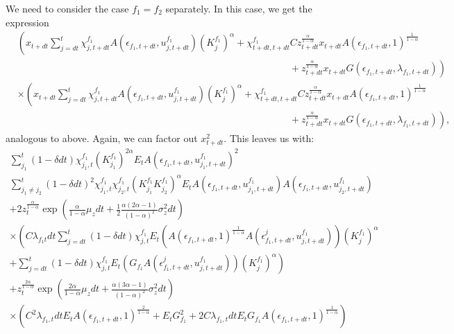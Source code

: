 We need to consider the case $f_1 = f_2$ separately. In this case, we get the expression 
{\footnotesize
\begin{align*}
    &\left(x_{t+dt} \sum_{ j = dt}^{t} \chi_{j, t+dt}^{f_1} A(\epsilon_{f_1,t+dt}, u_{j, t+dt}^{f_1})( K_j^{f_1})^{\alpha} + \chi_{t+dt, t+dt}^{f_1}C z_{t+dt}^{\frac{\alpha}{1 - \alpha}} x_{t+dt} A(\epsilon_{f_1, t+dt}, 1)^{\frac{1}{1 - \alpha}} \right.\\
    &\left.\qquad \qquad\qquad \qquad \qquad \qquad\qquad \qquad\qquad \qquad\qquad \qquad\qquad \qquad+ z_{t+dt}^{\frac{\alpha}{1 - \alpha}} x_{t+dt} G(\epsilon_{f_1,t+dt}, \lambda_{f_1,t+dt})\right) \\
    &\times \left(x_{t+dt} \sum_{ j = dt}^{t} \chi_{j, t+dt}^{f_1} A(\epsilon_{f_1,t+dt}, u_{j, t+dt}^{f_1})( K_j^{f_1})^{\alpha} + \chi_{t+dt, t+dt}^{f_1}C z_{t+dt}^{\frac{\alpha}{1 - \alpha}} x_{t+dt} A(\epsilon_{f_1, t+dt}, 1)^{\frac{1}{1 - \alpha}} \right.\\
    &\left.\qquad \qquad \qquad\qquad \qquad\qquad\qquad \qquad\qquad \qquad\qquad \qquad\qquad \qquad + z_{t+dt}^{\frac{\alpha}{1 - \alpha}} x_{t+dt} G(\epsilon_{f_1,t+dt}, \lambda_{f_1,t+dt})\right),
\end{align*}
}
analogous to above. Again, we can factor out $x_{t+dt}^2.$ This leaves us with: \begin{multline*}
    \sum_{j_1}^t (1 - \delta dt) \chi_{j_1, t}^{f_1} (K_{j_1}^{f_1})^{2\alpha} E_t A(\epsilon_{f_1, t+dt}, u_{j_1,t+dt}^{f_1})^2\\
    \sum_{j_1 \neq j_2}^t (1 - \delta dt)^2 \chi_{j_1, t}^{f_1} \chi_{j_2, t}^{f_1} (K_{j_1}^{f_1} K_{j_2}^{f_1})^{\alpha} E_t A(\epsilon_{f_1, t+dt}, u_{j_1,t+dt}^{f_1}) A(\epsilon_{f_1, t+dt}, u_{j_2,t+dt}^{f_1}) \\
    + 2 z_t^{\frac{\alpha}{1 - \alpha}} \exp \left( \frac{\alpha}{1 - \alpha}\mu_z dt + \frac{1}{2} \frac{\alpha(2 \alpha - 1)}{(1 - \alpha)^2}\sigma_z^2 dt\right) \\
    \times \left( C\lambda_{f_1 t} dt \sum_{j = dt}^t  (1 - \delta dt) \chi_{j, t}^{f_1} E_t (A(\epsilon_{f_1, t+dt}, 1)^{\frac{1}{1 - \alpha}} A(\epsilon_{f_1, t+dt}^j, u_{j, t+dt}^{f_1})) (K_j^{f_1})^{\alpha}\right.\\
    \left.+  \sum_{j = dt}^t  (1 - \delta dt) \chi_{j, t}^{f_1} E_t (G_{f_1} A(\epsilon_{f_1, t+dt}^j, u_{j, t+dt}^{f_1}) )(K_j^{f_1})^{\alpha}\right) \\
    +z_t^{\frac{2\alpha}{1 - \alpha}} \exp \left( \frac{2\alpha}{1 - \alpha}\mu_z dt +  \frac{ \alpha(3 \alpha - 1)}{(1 - \alpha)^2}\sigma_z^2 dt\right) \\
    \times \left( C^2 \lambda_{f_1, t} dt E_t  A(\epsilon_{f_1, t+dt}, 1)^{\frac{2}{1 - \alpha}} + E_t G_{f_1}^2 + 2 C \lambda_{f_1, t} dt  E_t G_{f_1} A(\epsilon_{f_1, t+dt}, 1)^{\frac{1}{1 - \alpha}} \right)
\end{multline*}
